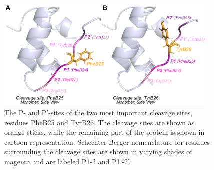 \documentclass[9pt]{elife}
\begin{document}
\begin{figure}[H]
\centering
\includegraphics[width=0.95\textwidth]{Figures/P_sites.png}
\caption{The P- and P'-sites of the two most important cleavage sites, residues PheB25 and TyrB26. The cleavage sites are shown as  orange sticks, while the remaining part of the protein is shown in cartoon representation. Schechter-Berger nomenclature for residues surrounding the cleavage sites are shown in varying shades of magenta and are labeled P1-3 and P1'-2'.}
\label{P_sites}
\end{figure}
\end{document}
